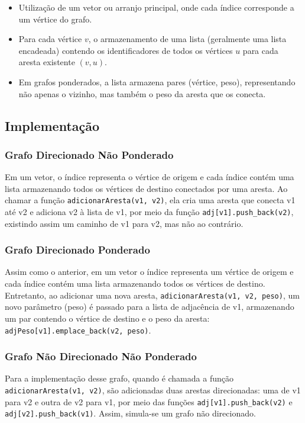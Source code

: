 \documentclass[12pt]{article}
\begin{document}
\begin{itemize}
    \item Utilização de um vetor ou arranjo principal, onde cada índice corresponde a um vértice do grafo.
    \item Para cada vértice $v$, o armazenamento de uma lista (geralmente uma lista encadeada) contendo os identificadores de todos os vértices $u$ para cada aresta existente $(v, u)$.
    \item Em grafos ponderados, a lista armazena pares (vértice, peso), representando não apenas o vizinho, mas também o peso da aresta que os conecta.
\end{itemize}

\subsection{Implementação}

\subsubsection{Grafo Direcionado Não Ponderado}
Em um vetor, o índice representa o vértice de origem e cada índice contém uma 
lista armazenando todos os vértices de destino conectados por uma 
aresta. Ao chamar a função \texttt{adicionarAresta(v1, v2)}, ela cria uma aresta que conecta 
v1 até v2 e adiciona v2 à lista de v1, por meio da função \texttt{adj[v1].push\_back(v2)}, 
existindo assim um caminho de v1 para v2, mas não ao contrário.

\subsubsection{Grafo Direcionado Ponderado}
Assim como o anterior, em um vetor o índice representa um vértice de origem e 
cada índice contém uma lista armazenando todos os vértices de destino. 
Entretanto, ao adicionar uma nova aresta, \texttt{adicionarAresta(v1, v2, peso)}, um novo 
parâmetro (peso) é passado para a lista de adjacência de v1, armazenando um par 
contendo o vértice de destino e o peso da aresta: \texttt{adjPeso[v1].emplace\_back(v2, peso)}.

\subsubsection{Grafo Não Direcionado Não Ponderado}
Para a implementação desse grafo, quando é chamada a função 
\texttt{adicionarAresta(v1, v2)}, são adicionadas duas arestas direcionadas: uma de v1 para 
v2 e outra de v2 para v1, por meio das funções \texttt{adj[v1].push\_back(v2)} e 
\texttt{adj[v2].push\_back(v1)}. Assim, simula-se um grafo não direcionado.
\end{document}

